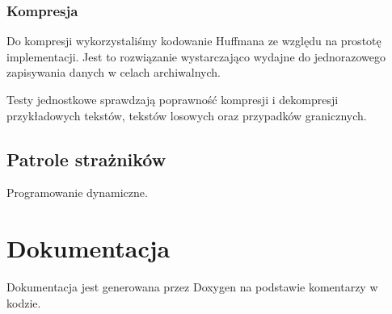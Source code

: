 \documentclass{article}
\begin{document}
\subsubsection{Kompresja}
Do kompresji wykorzystaliśmy kodowanie Huffmana ze względu na prostotę implementacji.
Jest to rozwiązanie wystarczająco wydajne
do jednorazowego zapisywania danych w celach archiwalnych.

\noindent Testy jednostkowe sprawdzają poprawność kompresji i dekompresji
przykładowych tekstów, tekstów losowych oraz przypadków granicznych.

\subsection{Patrole strażników}
Programowanie dynamiczne.

\section{Dokumentacja}
Dokumentacja jest generowana przez Doxygen na podstawie komentarzy w kodzie.

\printbibliography[heading=bibnumbered]
\end{document}
